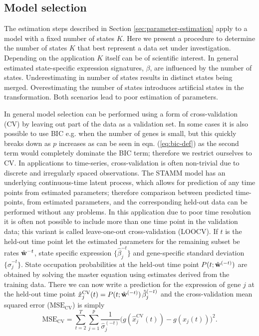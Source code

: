 \subsection{Model selection}
\label{sec:model-selection}

The estimation steps described in Section \ref{sec:parameter-estimation} apply to a model with a fixed number of states $K$. Here we present a procedure to determine the number of states $K$ that best represent a data set under investigation. Depending on the application $K$ itself can be of scientific interest. In general estimated state-specific expression signatures, $\beta$, are influenced by the number of states. Underestimating in number of states results in distinct states being merged. Overestimating the number of states introduces artificial states in the transformation. Both scenarios lead to poor estimation of parameters.

In general model selection can be performed using a form of cross-validation (CV) by leaving out part of the data as a
validation set. In some cases it is also possible to use BIC  e.g. when the number of genes is small, but this quickly
breaks down as $p$ increases as can be seen in eqn. (\ref{eq:bic-def}) as the second term would completely dominate the
BIC term; therefore we restrict ourselves to CV. In applications to time-series, cross-validation is often non-trivial due to discrete and irregularly spaced observations. The STAMM model has an underlying continuous-time latent process, which allows for prediction of any time points from estimated parameters; therefore comparison between predicted time-points, from estimated parameters, and the corresponding held-out data can be performed without any problems. In this application due to poor time resolution it is often not possible to include more than one time point in the validation data; this variant is called leave-one-out cross-validation (LOOCV). If $t$ is the held-out time point let the estimated parameters for the remaining subset be rates $\hat{\bf{w}}^{-t}$, state specific expression $\lbrace \hat{\beta}_j^{-t} \rbrace$ and gene-specific standard deviation $\lbrace \hat{\sigma}_j^{-t} \rbrace$. State occupation probabilities at the held-out time point  $P(t; \hat{\bf{w}}^{(-t)})$ are obtained by solving the master equation using estimates derived from the training data. There we can now write a prediction for the expression of gene $j$ at the held-out time point $\hat{x}^{\mathrm{CV}}_j(t) = P(t; \hat{\bf{w}}^{(-t)})\, \hat{\beta}_j^{(-t)}$ and the cross-validation
mean squared error ($\mathrm{MSE_{CV}}$) is simply
\begin{equation}
  \mathrm{MSE_{CV}}  =  \sum_{t=2}^T \sum_{j=1}^p \frac{1}{\hat{\sigma}_j^{(-t)}}\bigl( g(\hat{x}^{\mathrm{CV}}_j(t)) - g(x_j(t)) \bigr)^2.
  \label{eq:mse-cv}
\end{equation}

